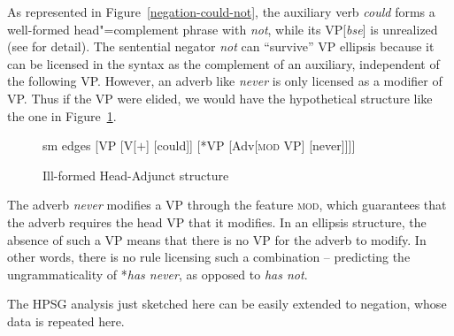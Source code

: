 \documentclass[output=paper
 	        ,biblatex
                ,babelshorthands
                ,newtxmath
                ,draftmode
                ,colorlinks, citecolor=brown
]{langscibook}
\begin{document}
\begin{exe}
\begin{xlist}
\begin{exe}
\begin{xlist}
As represented in Figure~\ref{negation-could-not}, the auxiliary verb \textit{could} forms a well-formed head"=complement phrase with \textit{not}, while its
VP[\textit{bse}] is unrealized (see \citealt{Kim:00, KS:08} for
detail). The sentential negator \textit{not} can ``survive'' VP ellipsis because it can be
licensed in the syntax as the complement of an auxiliary, independent
of the following VP.  However, an adverb like \textit{never} is only
licensed as a modifier of VP. Thus if the VP were elided, we would have the hypothetical
structure like the one in Figure~\ref{negation-fig-could-never}.
\begin{figure}
	\begin{forest}
		sm edges
		[VP
			[V{[\aux $+$]}
				[could]]
			[*VP
				[Adv{[\textsc{mod} VP]}
					[never]]]]
	\end{forest}
\caption{Ill-formed Head-Adjunct structure}\label{negation-fig-could-never}
\end{figure}
The adverb \textit{never} modifies a VP through the feature \textsc{mod},
which guarantees that the adverb requires the head VP that it
modifies. In an ellipsis structure, the absence of such a VP means
that there is no VP for the adverb to modify.  In other words, there
is no rule licensing such a combination -- predicting the
ungrammaticality of *\textit{has never},  as opposed to \textit{has not}.


The HPSG analysis just sketched here can be easily extended to  negation, whose
data is repeated here.

\eal
{}
\zl


\end{xlist}
\end{exe}
\end{xlist}
\end{exe}
\end{document}
